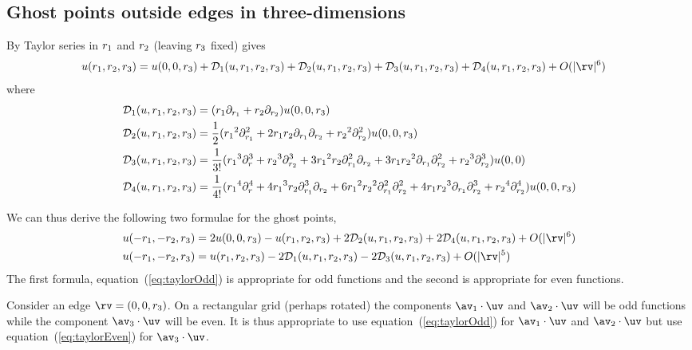 \subsection{Ghost points outside edges in three-dimensions}
By Taylor series in ${r_1}$ and ${r_2}$ (leaving ${r_3}$ fixed) gives
\begin{align*}
  u(\ra,\rb,\rc)&= u(0,0,\rc) + \Ds_1(u,\ra,\rb,\rc) + \Ds_2(u,\ra,\rb,\rc) 
             + \Ds_3(u,\ra,\rb,\rc) + \Ds_4(u,\ra,\rb,\rc) + \trunc
\end{align*}
where
\begin{align*}
  {\mathcal D}_1(u,{r_1},{r_2},{r_3}) &= ({r_1} \partial_{r_1} + {r_2} \partial_{r_2} ) u(0,0,{r_3}) \\
  {\mathcal D}_2(u,{r_1},{r_2},{r_3}) &= {1\over2}( {r_1}^2\partial_{r_1}^2
                            + 2{r_1}{r_2}\partial_{r_1}\partial_{r_2} +{r_2}^2\partial_{r_2}^2 )u(0,0,{r_3})  \\
  {\mathcal D}_3(u,{r_1},{r_2},{r_3}) &= {1\over3!}( {r_1}^3\partial_r^3 + {r_2}^3\partial_{r_2}^3 
                   +3{r_1}^2{r_2}\partial_{r_1}^2\partial_{r_2} 
                   + 3{r_1}{r_2}^2\partial_{r_1}\partial_{r_2}^2 
                   + {r_2}^3\partial_{r_2}^3  )u(0,0)                    \\
  {\mathcal D}_4(u,{r_1},{r_2},{r_3}) &= {1\over4!}( {r_1}^4\partial_r^4
                   +4{r_1}^3{r_2}\partial_{r_1}^3\partial_{r_2} 
                   +6{r_1}^2{r_2}^2\partial_{r_1}^2\partial_{r_2}^2 
                   +4{r_1}{r_2}^3\partial_{r_1}\partial_{r_2}^3 
                   + {r_2}^4\partial_{r_2}^4   )u(0,0,{r_3})  
\end{align*}

We can thus derive the following two formulae for the ghost points,
\begin{align}
 u(-\ra,-\rb,\rc) &= 2 u(0,0,\rc) - u(\ra,\rb,\rc) + 2\Ds_2(u,\ra,\rb,\rc) 
                         + 2\Ds_4(u,\ra,\rb,\rc)+ \trunc \label{eq:taylorOdd} \\
 u(-\ra,-\rb,\rc) &= u(\ra,\rb,\rc) - 2\Ds_1(u,\ra,\rb,\rc) - 2\Ds_3(u,\ra,\rb,\rc) 
                       + {O(|\rv|^5)} \label{eq:taylorEven}
\end{align}
The first formula, equation~(\ref{eq:taylorOdd}) is appropriate for odd functions and the
second is appropriate for even functions.

Consider an edge $\rv=(0,0,\rc)$. On a rectangular grid (perhaps rotated) the components 
$\av_1\cdot\uv$ and $\av_2\cdot\uv$ will be odd functions while the component
$\av_3\cdot\uv$ will be even. 
It is thus appropriate to use equation~(\ref{eq:taylorOdd}) for $\av_1\cdot\uv$ and $\av_2\cdot\uv$ but
use equation~(\ref{eq:taylorEven}) for $\av_3\cdot\uv$.

